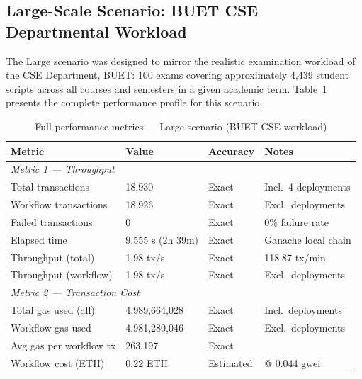 \documentclass[conference]{IEEEtran}
\begin{document}
\subsection{Large-Scale Scenario: BUET CSE Departmental Workload}
\label{sec:large}

The Large scenario was designed to mirror the realistic examination workload
of the CSE Department, BUET: 100 exams covering approximately 4,439 student
scripts across all courses and semesters in a given academic term.
Table~\ref{tab:large} presents the complete performance profile for this
scenario.

\begin{table}[!h]
\centering
\caption{Full performance metrics --- Large scenario (BUET CSE workload)}
\label{tab:large}
\renewcommand{\arraystretch}{1.35}
\begin{tabularx}{\textwidth}{p{5cm} p{3.5cm} p{2cm} X}
\toprule
\textbf{Metric} & \textbf{Value} & \textbf{Accuracy} & \textbf{Notes} \\
\midrule
\multicolumn{4}{l}{\textit{Metric 1 --- Throughput}} \\
\midrule
Total transactions             & 18,930          & Exact     & Incl.\ 4 deployments \\
Workflow transactions          & 18,926          & Exact     & Excl.\ deployments \\
Failed transactions            & 0               & Exact     & 0\% failure rate \\
Elapsed time                   & 9,555 s (2h 39m)& Exact     & Ganache local chain \\
Throughput (total)             & 1.98 tx/s       & Exact     & 118.87 tx/min \\
Throughput (workflow)          & 1.98 tx/s       & Exact     & Excl.\ deployments \\
\midrule
\multicolumn{4}{l}{\textit{Metric 2 --- Transaction Cost}} \\
\midrule
Total gas used (all)           & 4,989,664,028   & Exact     & Incl.\ deployments \\
Workflow gas used              & 4,981,280,046   & Exact     & Excl.\ deployments \\
Avg gas per workflow tx        & 263,197         & Exact     & \\
Workflow cost (ETH)            & 0.22 ETH       & Estimated & @ 0.044 gwei \\

\end{tabularx}
\end{table}
\end{document}

